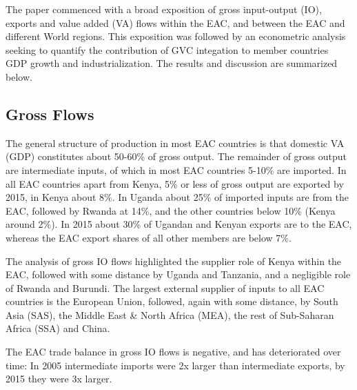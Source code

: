 \documentclass[a4paper]{article}
\begin{document}
The paper commenced with a broad exposition of gross input-output (IO), exports and value added (VA) flows within the EAC, and between the EAC and different World regions. This exposition was followed by an econometric analysis seeking to quantify the contribution of GVC integation to member countries GDP growth and industrialization. The results and discussion are summarized below. \newline

\subsection{Gross Flows}

The general structure of production in most EAC countries is that domestic VA (GDP) constitutes about 50-60\% of gross output. The remainder of gross output are intermediate inputs, of which in most EAC countries 5-10\% are imported. In all EAC countries apart from Kenya, 5\% or less of  gross output are exported by 2015, in Kenya about 8\%. In Uganda about 25\% of imported inputs are from the EAC, followed by Rwanda at 14\%, and the other countries below 10\% (Kenya around 2\%). In 2015 about 30\% of Ugandan and Kenyan exports are to the EAC, whereas the EAC export shares of all other members are below 7\%. \newline

The analysis of gross IO flows highlighted the supplier role of Kenya within the EAC, followed with some distance by Uganda and Tanzania, and a negligible role of Rwanda and Burundi. The largest external supplier of inputs to all EAC countries is the European Union, followed, again with some distance, by South Asia (SAS), the Middle East \& North Africa (MEA), the rest of Sub-Saharan Africa (SSA) and China. \newline

The EAC trade balance in gross IO flows is negative, and has deteriorated over time: In 2005 intermediate imports were 2x larger than intermediate exports, by 2015 they were 3x larger. \newline
\end{document}
